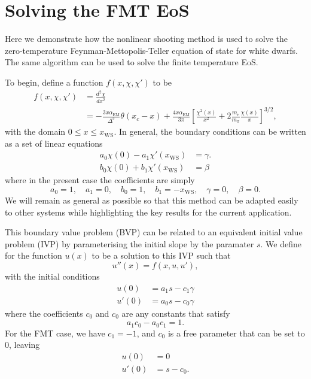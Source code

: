 \chapter{Solving the FMT EoS}
\label{app:FMT_solution}

Here we demonstrate how the nonlinear shooting method is used to solve the zero-temperature Feynman-Mettopolis-Teller equation of state for white dwarfs. The same algorithm can be used to solve the finite temperature EoS. 

To begin, define a function $f(x, \chi, \chi')$ to be
\begin{align}
    f(x, \chi, \chi') & = \frac{d^2\chi}{dx^2}\\
    & =  -\frac{3 x \alpha_\mathrm{EM}}{\Delta^3}\theta(x_c -x) + \frac{4 x\alpha_\mathrm{EM}}{3\pi}\left[ \frac{\chi^2(x)}{x^2} + 2\frac{m_e}{m_\pi}\frac{\chi(x)}{x}\right]^{3/2},
 \end{align}   
with the domain $0 \leq x \leq x_\mathrm{WS}$.
In general, the boundary conditions can be written as a set of linear equations
\begin{align}
    a_0 \chi(0) - a_1 \chi'(x_\mathrm{WS}) &= \gamma. \\ 
    b_0 \chi(0) + b_1 \chi'(x_\mathrm{WS}) & = \beta
\end{align}
where in the present case the coefficients are simply
\begin{equation}
    a_0 = 1,\quad a_1 = 0,\quad b_0 = 1,\quad b_1 = -x_\mathrm{WS}, \quad \gamma =0,\quad \beta = 0.
\end{equation}
We will remain as general as possible so that this method can be adapted easily to other systems while highlighting the key results for the current application.

This boundary value problem (BVP) can be related to an equivalent initial value problem (IVP) by parameterising the initial slope by the paramater $s$.  We define for the function $u(x)$ to be a solution to this IVP such that
\begin{equation}
    u''(x) = f(x, u, u'),
\end{equation}
with the initial conditions
\begin{align}
    u(0) & = a_1 s - c_1 \gamma \\
    u'(0) & = a_0 s - c_0 \gamma 
\end{align}
where the coefficients $c_0$ and $c_0$ are any constants that satisfy 
\begin{equation}
    a_1 c_0 - a_0 c_1 = 1.
\end{equation}
For the FMT case, we have $c_1 = -1$, and $c_0$ is a free parameter that can be set to 0, leaving
\begin{align}
     u(0) & = 0\\
     u'(0) & = s - c_0.
\end{align}

